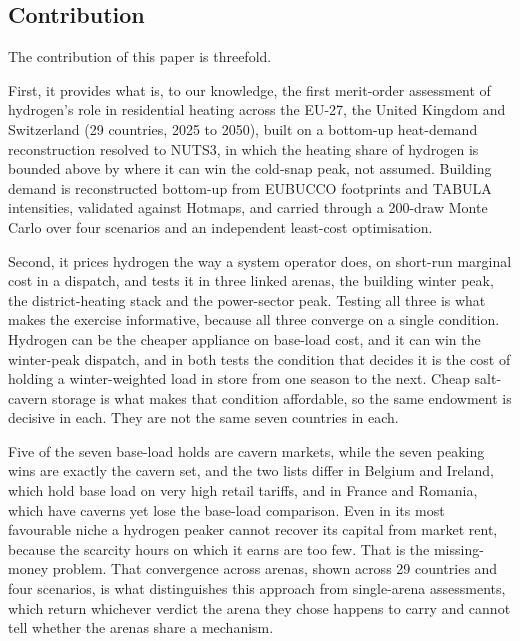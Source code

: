 \subsection{Contribution}

The contribution of this paper is threefold.

First, it provides what is, to our
knowledge, the first merit-order assessment of hydrogen's
role in residential heating across the EU-27, the United Kingdom and Switzerland
(29 countries, 2025 to 2050), built on a bottom-up heat-demand reconstruction
resolved to NUTS3, in which the heating share of
hydrogen is bounded above by where it can win the cold-snap peak, not assumed.
Building demand is reconstructed bottom-up from EUBUCCO footprints and TABULA
intensities, validated against Hotmaps, and carried through a 200-draw Monte
Carlo over four scenarios and an independent least-cost optimisation.

Second, it prices hydrogen the way a system operator does, on short-run marginal cost in
a dispatch, and tests it in three linked arenas, the building winter peak, the
district-heating stack and the power-sector peak. Testing all three is
what makes the exercise informative, because all three converge on a single condition.
Hydrogen can be the cheaper appliance on base-load cost, and it can win the winter-peak
dispatch, and in both tests the condition that decides it is the cost of holding a
winter-weighted load in store from one season to the next. Cheap salt-cavern storage is
what makes that condition affordable, so the same endowment is decisive in each. They are not the same seven countries in each.

Five of the seven base-load holds are cavern markets, while the seven peaking wins are
exactly the cavern set, and the two lists differ in Belgium and Ireland, which hold base
load on very high retail tariffs, and in France and Romania, which have caverns yet lose
the base-load comparison. Even in its most favourable niche a hydrogen peaker cannot
recover its capital from market rent, because the scarcity hours on which it earns are
too few. That is the missing-money problem. That convergence across arenas, shown across
29 countries and four scenarios, is what distinguishes this approach from single-arena
assessments, which return whichever verdict the arena they chose happens to carry and
cannot tell whether the arenas share a mechanism.

